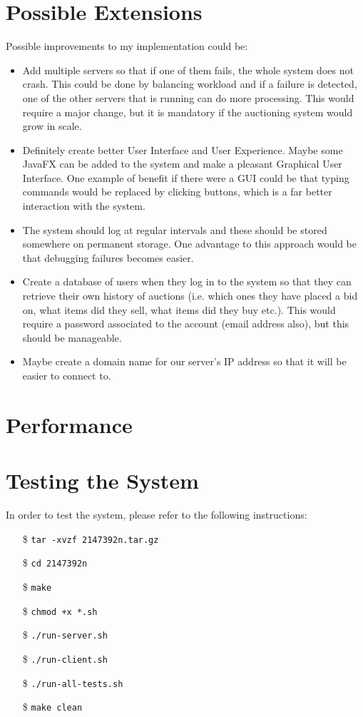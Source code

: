 \documentclass[11pt]{article}
\begin{document}
\section*{Possible Extensions}
 Possible improvements to my implementation could be:
 \begin{itemize}
     \item Add multiple servers so that if one of them fails, the whole system does not crash. This could be done by balancing workload and if a failure is detected, one of the other servers that is running can do more processing. This would require a major change, but it is mandatory if the auctioning system would grow in scale.
     \item Definitely create better User Interface and User Experience. Maybe some JavaFX can be added to the system and make a pleasant Graphical User Interface. One example of benefit if there were a GUI could be that typing commands would be replaced by clicking buttons, which is a far better interaction with the system.
     \item The system should log at regular intervals and these should be stored somewhere on permanent storage. One advantage to this approach would be that debugging failures becomes easier.
     \item Create a database of users when they log in to the system so that they can retrieve their own history of auctions (i.e. which ones they have placed a bid on, what items did they sell, what items did they buy etc.). This would require a password associated to the account (email address also), but this should be manageable.
     \item Maybe create a domain name for our server's IP address so that it will be easier to connect to.
 \end{itemize}

\section*{Performance}


\section*{Testing the System}
 In order to test the system, please refer to the following instructions:
 \begin{itemize}
     \item[\$] \texttt{tar -xvzf 2147392n.tar.gz}
     \item[\$] \texttt{cd 2147392n}
     \item[\$] \texttt{make}
     \item[\$] \texttt{chmod +x *.sh}
     \item[\$] \texttt{./run-server.sh}
     \item[\$] \texttt{./run-client.sh}
     \item[\$] \texttt{./run-all-tests.sh}
     \item[\$] \texttt{make clean}     
 \end{itemize}
\end{document}
